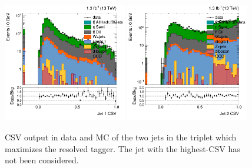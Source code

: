 \begin{figure}[htbp]
	\centering
	\includegraphics[width=0.48\textwidth]{figures/semilep_1tightmuo_resolved_3ormorejets_2ormorejetWPm_pfmetmore100_pfmtmore40_trigrequestonMC_qgsmearedwith8TeVrecipe_Oct302015/res_hJet1csv.png}
	\includegraphics[width=0.48\textwidth]{figures/semilep_1tightmuo_resolved_3ormorejets_2ormorejetWPm_pfmetmore100_pfmtmore40_trigrequestonMC_qgsmearedwith8TeVrecipe_Oct302015/res_hJet2csv.png}
	\caption{CSV output in data and MC of the two jets in the triplet which maximizes the resolved tagger. The jet with the highest-CSV has not been considered.}
	\label{fig:jet12csv}
\end{figure}

